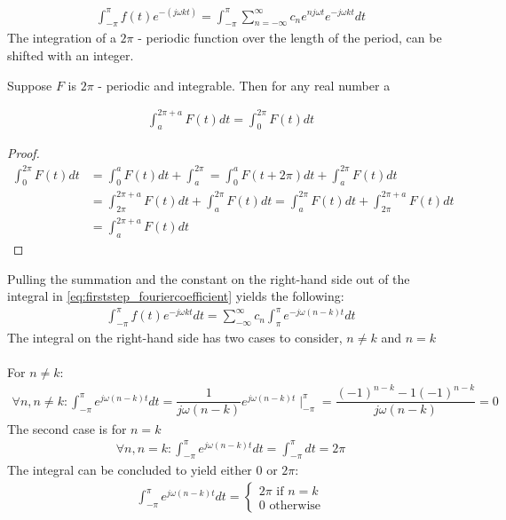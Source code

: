 \begin{align} \label{eq:firststep_fouriercoefficient}
	\int_{-\pi}^\pi f(t)e^{-(j\omega k t)} = \int_{-\pi}^\pi \sum_{n=-\infty}^{\infty} c_n e^{n j\omega t} e^{-j\omega k t} dt
\end{align}
The integration of a $2\pi$ - periodic function over the length of the period, can be shifted with an integer.

\begin{lemma}\label{lemma:2pi-periodic_function}
Suppose $F$ is $2\pi$ - periodic and integrable. Then for any real number a 

\begin{align}
\int_a^{2\pi+a}F(t) dt = \int_0^{2\pi}F(t)dt
\end{align}
\end{lemma}
\begin{proof}
\begin{align*}
	\int_0^{2\pi}F(t)dt 
	&= \int_0^a F(t) dt + \int_a^{2\pi} 
	= \int_0^a F(t+2\pi)dt + \int_a^{2\pi} F(t) dt\\ 
	&= \int_{2\pi}^{2\pi + a} F(t) dt + \int_a^{2\pi}F(t)dt
	= \int_a^{2\pi}F(t)dt	+ \int_{2\pi}^{2\pi + a} F(t)dt \\
	&= \int_a^{2\pi+a}F(t)dt
\end{align*}
\end{proof}
Pulling the summation and the constant on the right-hand side out of the integral in \eqref{eq:firststep_fouriercoefficient} yields the following:
\begin{align*}
	\int_{-\pi}^\pi f(t) e^{-j \omega k t}dt
	= \sum_{-\infty}^\infty c_n \int_{\pi}^\pi e^{-j \omega(n-k)t}dt
\end{align*} 
The integral on the right-hand side has two cases to consider, $n \neq k$ and $n = k$\\\\
For $n\neq k$:
\begin{align*}
	\forall n,n\neq k: \int_{-\pi}^\pi e^{j\omega(n-k)t}dt 
	=\dfrac{1}{j\omega(n-k)}e^{j\omega(n-k)t}\mid_{-\pi}^{\pi}
	=\dfrac{(-1)^{n-k}-1(-1)^{n-k}}{j\omega(n-k)}
	=0
\end{align*}
The second case is for $n = k$
\begin{align*}
	\forall n,n=k: \int_{-\pi}^\pi e^{j\omega(n-k)t}dt = \int_{-\pi}^\pi dt = 2\pi
\end{align*}
The integral can be concluded to yield either $0$ or $2\pi$:
\begin{align}
	\int_{-\pi}^{\pi} e^{j \omega (n-k)t}dt 
	= 
	\begin{cases}
			2\pi \text{ if } n=k\\
			0 \text{ otherwise}
	\end{cases}
\end{align}
